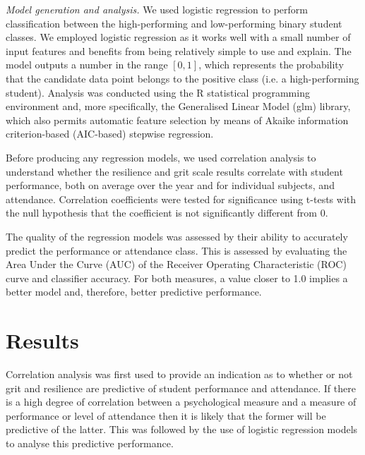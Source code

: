 \documentclass[sigconf]{acmart}
\begin{document}
{\em Model generation and analysis.}
We used logistic regression to perform classification between the high-performing and low-performing binary student classes. We employed logistic regression as it works well with a small number of input features and benefits from being relatively simple to use and explain. The model outputs a number in the range $[0,1]$, which represents the probability that the candidate data point belongs to the positive class (i.e. a high-performing student). Analysis was conducted using the R statistical programming environment and, more specifically, the Generalised Linear Model (glm) library, which also permits automatic feature selection by means of Akaike information criterion-based (AIC-based) stepwise regression.

Before producing any regression models, we used correlation analysis to understand whether the resilience and grit scale results correlate with student performance, both on average over the year and for individual subjects, and attendance. Correlation coefficients were tested for significance using t-tests with the null hypothesis that the coefficient is not significantly different from 0. 

The quality of the regression models was assessed by their ability to accurately predict the performance or attendance class. This is assessed by evaluating the Area Under the Curve (AUC) of the Receiver Operating Characteristic (ROC) curve and classifier accuracy. For both measures, a value closer to 1.0 implies a better model and, therefore, better predictive performance. 

\section {Results}
Correlation analysis was first used to provide an indication as to whether or not grit and resilience are predictive of student performance and attendance. If there is a high degree of correlation between a psychological measure and a measure of performance or level of attendance then it is likely that the former will be predictive of the latter. This was followed by the use of logistic regression models to analyse this predictive performance.

\end{document}
